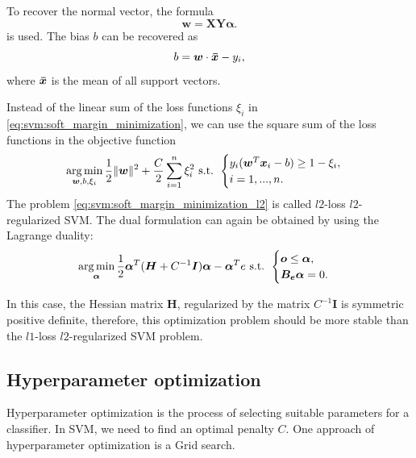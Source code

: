 To recover the normal vector, the formula
\begin{equation}
    \boldsymbol{w}=\boldsymbol{X}\boldsymbol{Y}\boldsymbol{\alpha}.
    \label{eq:svm:dual_to_primal_w}
\end{equation}
is used. The bias $b$ can be recovered as
\begin{equation}
    b=\boldsymbol{w}\cdot \boldsymbol{\Bar{x}} - y_i,
    \label{eq:svm:dual_to_primal_b}
\end{equation}
where $\boldsymbol{\Bar{x}}$ is the mean of all support vectors.

Instead of the linear sum of the loss functions $\xi_i$ in \eqref{eq:svm:soft_margin_minimization}, we can use the square sum of the loss functions in the objective function
\begin{equation}
    \operatorname*{arg\,min}_{\boldsymbol{w},b,\xi_i} \frac{1}{2}\|\boldsymbol{w}\|^2 + \frac{C}{2}\sum_{i = 1}^n\xi_i^2 \text{ s.t. } 
    \begin{cases}
        y_i(\boldsymbol{w}^T\boldsymbol{x}_i-b)\geq1 - \xi_i,\\
        i=1, ...,n.
    \end{cases}
    \label{eq:svm:soft_margin_minimization_l2}
\end{equation}
The problem \eqref{eq:svm:soft_margin_minimization_l2} is called $l2$-loss $l2$-regularized SVM. The dual formulation can again be obtained by using the Lagrange duality:
\begin{equation}
    \operatorname*{arg\,min}_{\boldsymbol{\alpha}} \frac{1}{2} \boldsymbol{\alpha}^T(\boldsymbol{H}+C^{-1}\boldsymbol{I})\boldsymbol{\alpha} - \boldsymbol{\alpha}^Te \text{ s.t. } 
    \begin{cases}
        \boldsymbol{o} \leq \boldsymbol{\alpha},\\
        \boldsymbol{B_e}\boldsymbol{\alpha}=0.
    \end{cases}
    \label{eq:svm:soft_margin_dual-l2}
\end{equation}

In this case, the Hessian matrix $\boldsymbol{H}$, regularized by the matrix $C^{-1}\boldsymbol{I}$ is symmetric positive definite, therefore, this optimization problem should be more stable than the $l1$-loss $l2$-regularized SVM problem.

\subsection{Hyperparameter optimization}
Hyperparameter optimization is the process of selecting suitable parameters for a classifier. In SVM, we need to find an optimal penalty $C$. One approach of hyperparameter optimization is a Grid search.

